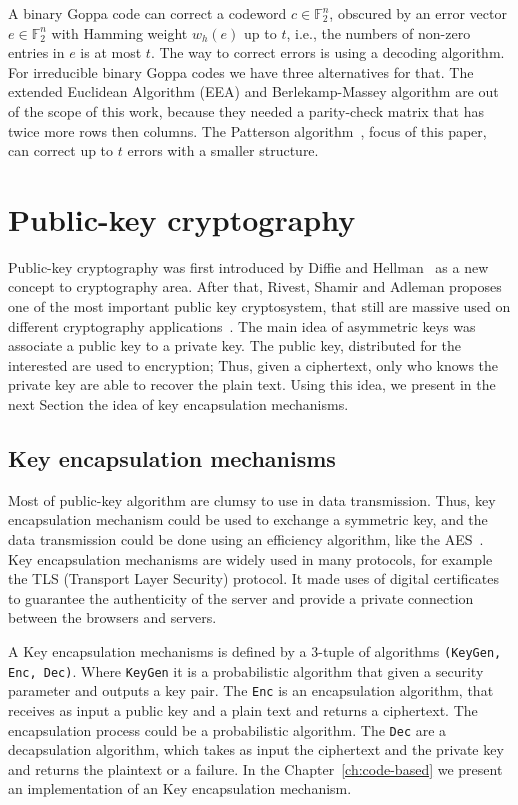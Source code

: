 A binary Goppa code can correct a codeword $c \in \mathbb{F}_{2}^n$, obscured by an error vector $e \in \mathbb{F}_{2}^n$ with Hamming weight $w_h(e)$ up to $t$, i.e., the numbers of non-zero entries in $e$ is at most $t$. The way to correct errors is using a decoding algorithm. For irreducible binary Goppa codes we have three alternatives for that. The extended Euclidean Algorithm (EEA) and Berlekamp-Massey algorithm are out of the scope of this work, because they needed a parity-check matrix that has twice more rows then columns. The Patterson algorithm~\cite{patterson1975algebraic}, focus of this paper, can correct up to $t$ errors with a smaller structure.

\section{Public-key cryptography}
Public-key cryptography was first introduced by Diffie and Hellman~\cite{diffie1976new} as a new concept to cryptography area. After that, Rivest, Shamir and Adleman proposes one of the most important public key cryptosystem, that still are massive used on different cryptography applications~\cite{rivest1978method}. The main idea of asymmetric keys was associate a public key to a private key. The public key, distributed for the interested are used to encryption; Thus, given a ciphertext, only who knows the private key are able to recover the plain text. Using this idea, we present in the next Section the idea of key encapsulation mechanisms.

\subsection{Key encapsulation mechanisms}
Most of public-key algorithm are clumsy to use in data transmission. Thus, key encapsulation mechanism could be used to exchange a symmetric key, and the data transmission could be done using an efficiency algorithm, like the AES~\cite{daemen2013design}. Key encapsulation mechanisms are widely used in many protocols, for example the TLS (Transport Layer Security) protocol. It made uses of digital certificates to guarantee the authenticity of the server and provide a private connection between the browsers and servers.

A Key encapsulation mechanisms is defined by a 3-tuple of algorithms \texttt{(KeyGen, Enc, Dec)}. Where \texttt{KeyGen} it is a probabilistic algorithm that given a security parameter and outputs a key pair. The \texttt{Enc} is an encapsulation algorithm, that receives as input a public key and a plain text and returns a ciphertext. The encapsulation process could be a probabilistic algorithm. The \texttt{Dec} are a decapsulation algorithm, which takes as input the ciphertext and the private key and returns the plaintext or a failure. In the Chapter~\ref{ch:code-based} we present an implementation of an Key encapsulation mechanism.

